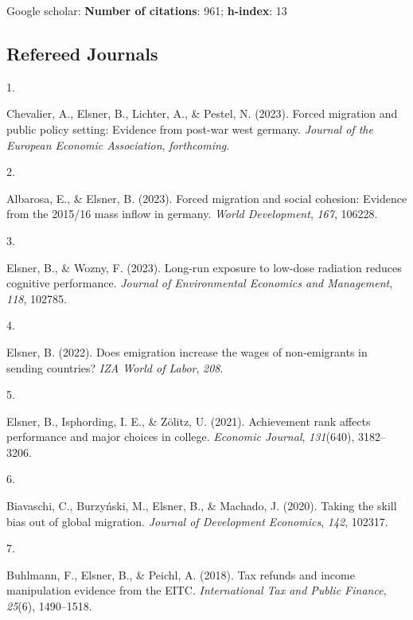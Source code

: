 \documentclass[10pt,a4paper,]{article}
\newlength{\cslhangindent}
\newlength{\csllabelwidth}
\newenvironment{CSLReferences}[2] %
 {\begin{list}{}{%
  \setlength{\itemindent}{0pt}
  \setlength{\leftmargin}{0pt}
  \setlength{\parsep}{0pt}
  \ifodd #1
   \setlength{\leftmargin}{\cslhangindent}
   \setlength{\itemindent}{-1\cslhangindent}
  \fi
  \setlength{\itemsep}{#2\baselineskip}}}
 {\end{list}}
\newcommand{\CSLLeftMargin}[1]{\parbox[t]{\csllabelwidth}{\strut#1\strut}}
\newcommand{\CSLRightInline}[1]{\parbox[t]{\linewidth - \csllabelwidth}{\strut#1\strut}}
\begin{document}
Google scholar: \textbf{Number of citations}: 961; \textbf{h-index}: 13

\hypertarget{refereed-journals}{%
\subsection{Refereed Journals}\label{refereed-journals}}

\hypertarget{refs-3ae327f459a81bf3f78b78cb25ae2ea9}{}
\begin{CSLReferences}{0}{0}
\leavevmode{}%
\CSLLeftMargin{1. }%
\CSLRightInline{Chevalier, A., Elsner, B., Lichter, A., \& Pestel, N.
(2023). Forced migration and public policy setting: Evidence from
post-war west germany. \emph{Journal of the European Economic
Association}, \emph{forthcoming}.}

\leavevmode{}%
\CSLLeftMargin{2. }%
\CSLRightInline{Albarosa, E., \& Elsner, B. (2023). Forced migration and
social cohesion: Evidence from the 2015/16 mass inflow in germany.
\emph{World Development}, \emph{167}, 106228.}

\leavevmode{}%
\CSLLeftMargin{3. }%
\CSLRightInline{Elsner, B., \& Wozny, F. (2023). Long-run exposure to
low-dose radiation reduces cognitive performance. \emph{Journal of
Environmental Economics and Management}, \emph{118}, 102785.}

\leavevmode{}%
\CSLLeftMargin{4. }%
\CSLRightInline{Elsner, B. (2022). Does emigration increase the wages of
non-emigrants in sending countries? \emph{IZA World of Labor},
\emph{208}.}

\leavevmode{}%
\CSLLeftMargin{5. }%
\CSLRightInline{Elsner, B., Isphording, I. E., \& Zölitz, U. (2021).
Achievement rank affects performance and major choices in college.
\emph{Economic Journal}, \emph{131}(640), 3182--3206.}

\leavevmode{}%
\CSLLeftMargin{6. }%
\CSLRightInline{Biavaschi, C., Burzyński, M., Elsner, B., \& Machado, J.
(2020). Taking the skill bias out of global migration. \emph{Journal of
Development Economics}, \emph{142}, 102317.}

\leavevmode{}%
\CSLLeftMargin{7. }%
\CSLRightInline{Buhlmann, F., Elsner, B., \& Peichl, A. (2018). Tax
refunds and income manipulation evidence from the EITC.
\emph{International Tax and Public Finance}, \emph{25}(6), 1490--1518.}


\end{CSLReferences}
\end{document}
